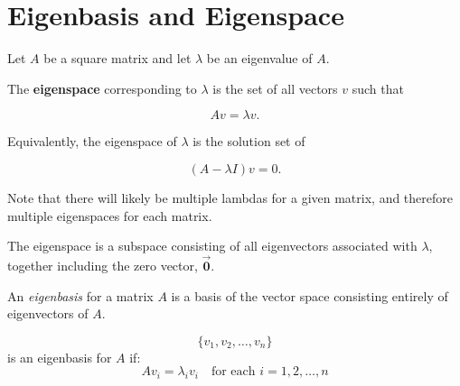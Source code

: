 \section{Eigenbasis and Eigenspace}
Let $A$ be a square matrix and let $\lambda$ be an eigenvalue of $A$.

\begin{mdframed}[frametitle = {Eigenspace}, style = important]

The \textbf{eigenspace} corresponding to \(\lambda\) is the set of all vectors \(v\) such that

\[
Av = \lambda v.
\]

Equivalently, the eigenspace of \(\lambda\) is the solution set of

\[
(A - \lambda I)v = 0.
\]

Note that there will likely be multiple lambdas for a given matrix, and therefore multiple eigenspaces for each matrix. 

The eigenspace is a subspace consisting of all eigenvectors associated with \(\lambda\), together including the zero vector, $\vec{\mathbf{0}}$.
\end{mdframed}

\begin{mdframed}[frametitle = {Eigenbasis}, style = important]
An \emph{eigenbasis} for a matrix \(A\) is a basis of the vector space consisting entirely of eigenvectors of \(A\).

$$\{v_1, v_2, \dots, v_n\}$$
is an eigenbasis for $A$ if:
$$Av_i = \lambda_i v_i \quad \text{for each } i = 1, 2, \dots, n$$
\end{mdframed}





